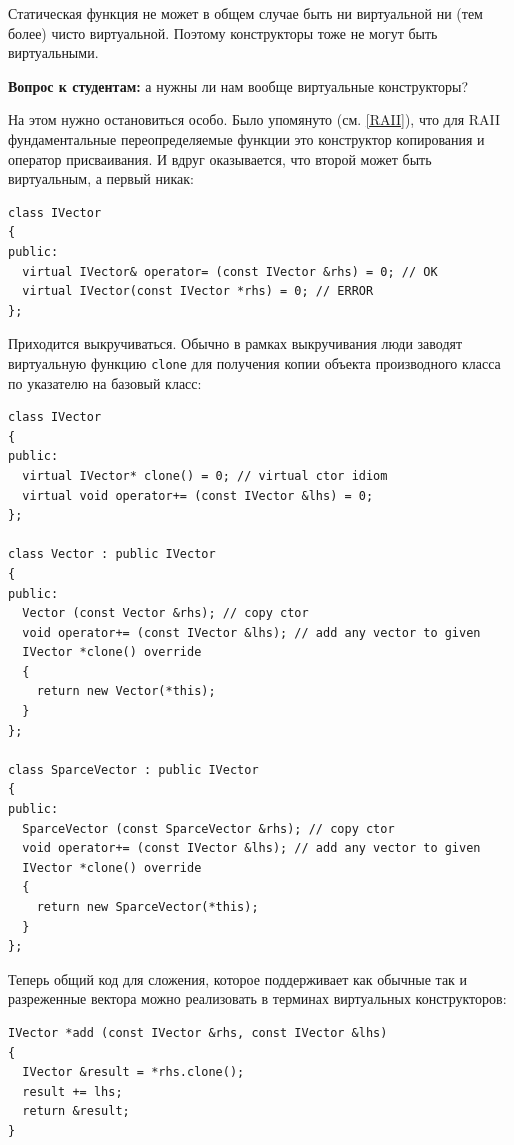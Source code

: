 \documentclass[a4paper,12pt,oneside]{article}
\newif\ifanswers
\begin{document}
Статическая функция не может в общем случае быть ни виртуальной ни (тем более) чисто виртуальной. Поэтому конструкторы тоже не могут быть виртуальными.

\textbf{Вопрос к студентам:} а нужны ли нам вообще виртуальные конструкторы?

\ifanswers
Правильный ответ: да очень нужны. Скажем виртуальный конструктор копирования позволил бы создать в явном виде объект производного класса по указателю на объект базового класса
\fi

На этом нужно остановиться особо. Было упомянуто (см. \ref{RAII}), что для RAII фундаментальные переопределяемые функции это конструктор копирования и оператор присваивания. И вдруг оказывается, что второй может быть виртуальным, а первый никак:

\begin{lstlisting}
class IVector
{
public:
  virtual IVector& operator= (const IVector &rhs) = 0; // OK
  virtual IVector(const IVector *rhs) = 0; // ERROR
};
\end{lstlisting}

Приходится выкручиваться. Обычно в рамках выкручивания люди заводят виртуальную функцию \lstinline!clone! для получения копии объекта производного класса по указателю на базовый класс:

\begin{lstlisting}
class IVector
{
public:
  virtual IVector* clone() = 0; // virtual ctor idiom
  virtual void operator+= (const IVector &lhs) = 0;
};

class Vector : public IVector
{
public: 
  Vector (const Vector &rhs); // copy ctor
  void operator+= (const IVector &lhs); // add any vector to given
  IVector *clone() override
  {
    return new Vector(*this);
  }
};

class SparceVector : public IVector
{
public: 
  SparceVector (const SparceVector &rhs); // copy ctor
  void operator+= (const IVector &lhs); // add any vector to given
  IVector *clone() override
  {
    return new SparceVector(*this);
  }
};
\end{lstlisting}

Теперь общий код для сложения, которое поддерживает как обычные так и разреженные вектора можно реализовать в терминах виртуальных конструкторов:

\begin{lstlisting}
IVector *add (const IVector &rhs, const IVector &lhs)
{
  IVector &result = *rhs.clone();
  result += lhs;
  return &result;
}
\end{lstlisting}
\end{document}
